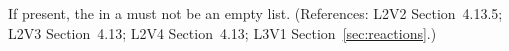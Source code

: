 If present, the  in a \KineticLaw must not
be an empty list.  (References: L2V2 Section~4.13.5; L2V3
Section~4.13; L2V4 Section~4.13; L3V1 Section~\ref{sec:reactions}.)
